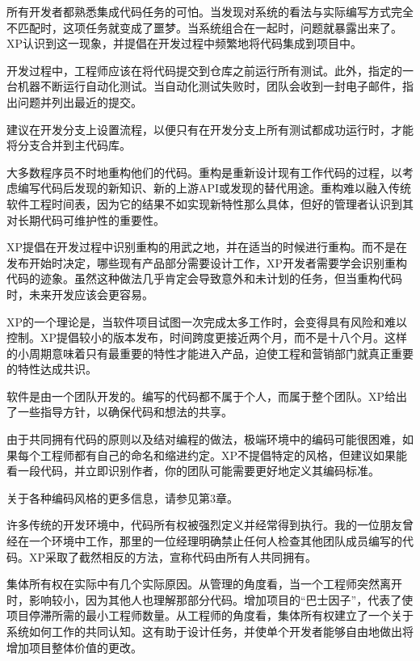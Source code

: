 
所有开发者都熟悉集成代码任务的可怕。当发现对系统的看法与实际编写方式完全不匹配时，这项任务就变成了噩梦。当系统组合在一起时，问题就暴露出来了。XP认识到这一现象，并提倡在开发过程中频繁地将代码集成到项目中。

开发过程中，工程师应该在将代码提交到仓库之前运行所有测试。此外，指定的一台机器不断运行自动化测试。当自动化测试失败时，团队会收到一封电子邮件，指出问题并列出最近的提交。

建议在开发分支上设置流程，以便只有在开发分支上所有测试都成功运行时，才能将分支合并到主代码库。


大多数程序员不时地重构他们的代码。重构是重新设计现有工作代码的过程，以考虑编写代码后发现的新知识、新的上游API或发现的替代用途。重构难以融入传统软件工程时间表，因为它的结果不如实现新特性那么具体，但好的管理者认识到其对长期代码可维护性的重要性。

XP提倡在开发过程中识别重构的用武之地，并在适当的时候进行重构。而不是在发布开始时决定，哪些现有产品部分需要设计工作，XP开发者需要学会识别重构代码的迹象。虽然这种做法几乎肯定会导致意外和未计划的任务，但当重构代码时，未来开发应该会更容易。


XP的一个理论是，当软件项目试图一次完成太多工作时，会变得具有风险和难以控制。XP提倡较小的版本发布，时间跨度更接近两个月，而不是十八个月。这样的小周期意味着只有最重要的特性才能进入产品，迫使工程和营销部门就真正重要的特性达成共识。


软件是由一个团队开发的。编写的代码都不属于个人，而属于整个团队。XP给出了一些指导方针，以确保代码和想法的共享。


由于共同拥有代码的原则以及结对编程的做法，极端环境中的编码可能很困难，如果每个工程师都有自己的命名和缩进约定。XP不提倡特定的风格，但建议如果能看一段代码，并立即识别作者，你的团队可能需要更好地定义其编码标准。

关于各种编码风格的更多信息，请参见第3章。


许多传统的开发环境中，代码所有权被强烈定义并经常得到执行。我的一位朋友曾经在一个环境中工作，那里的一位经理明确禁止任何人检查其他团队成员编写的代码。XP采取了截然相反的方法，宣称代码由所有人共同拥有。

集体所有权在实际中有几个实际原因。从管理的角度看，当一个工程师突然离开时，影响较小，因为其他人也理解那部分代码。增加项目的“巴士因子”，代表了使项目停滞所需的最小工程师数量。从工程师的角度看，集体所有权建立了一个关于系统如何工作的共同认知。这有助于设计任务，并使单个开发者能够自由地做出将增加项目整体价值的更改。

